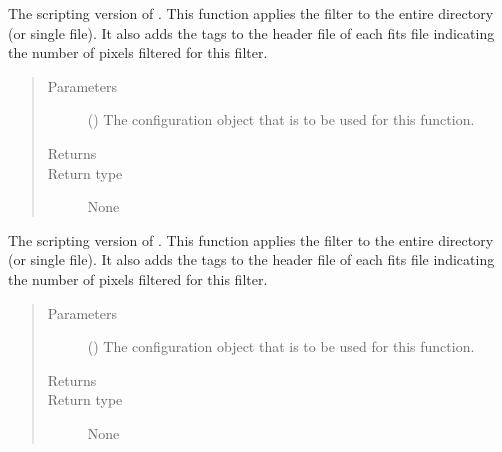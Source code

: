 \documentclass[letterpaper,10pt,english]{sphinxmanual}
\begin{document}
\begin{fulllineitems}
\label{\detokenize{docstrings/ifa_smeargle.masking.scripting:ifa_smeargle.masking.scripting.script_filter_minimum_value}}
The scripting version of . This
function applies the filter to the entire directory (or single
file). It also adds the tags to the header file of each fits file
indicating the number of pixels filtered for this filter.
\begin{quote}\begin{description}
\item[{Parameters}] \leavevmode
{} () \textendash{} The configuration object that is to be used for this
function.

\item[{Returns}] \leavevmode


\item[{Return type}] \leavevmode
None

\end{description}\end{quote}

\end{fulllineitems}


\begin{fulllineitems}
\label{\detokenize{docstrings/ifa_smeargle.masking.scripting:ifa_smeargle.masking.scripting.script_filter_percent_truncation}}
The scripting version of . This
function applies the filter to the entire directory (or single
file). It also adds the tags to the header file of each fits file
indicating the number of pixels filtered for this filter.
\begin{quote}\begin{description}
\item[{Parameters}] \leavevmode
{} () \textendash{} The configuration object that is to be used for this
function.

\item[{Returns}] \leavevmode


\item[{Return type}] \leavevmode
None

\end{description}\end{quote}

\end{fulllineitems}
\end{document}
